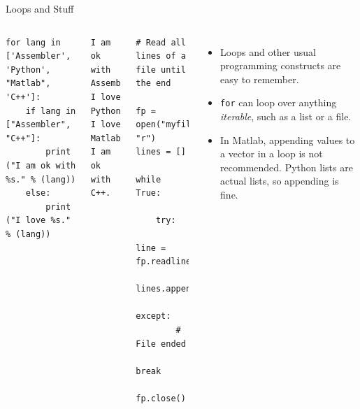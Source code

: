 \documentclass[10pt, aspectratio=169]{beamer} %
\begin{document}
\begin{frame}[fragile,allowframebreaks=0.8]
 {Loops and Stuff}
\begin{columns}[onlytextwidth]
\begin{lstlisting}
for lang in ['Assembler', 'Python', "Matlab", 'C++']:
    if lang in ["Assembler", "C++"]:
        print ("I am ok with %s." % (lang))
    else:
        print ("I love %s." % (lang))
\end{lstlisting}
\begin{lstlisting}
I am ok with Assembler.
I love Python.
I love Matlab.
I am ok with C++.
\end{lstlisting}
\begin{lstlisting}
# Read all lines of a file until the end

fp = open("myfile.txt", "r")
lines = []

while True:
    
    try:
        line = fp.readline()
        lines.append(line)
    except:
        # File ended
        break

fp.close()
\end{lstlisting}
\begin{itemize}
\item Loops and other usual programming constructs are easy to remember.
\item \verb+for+ can loop over anything \emph{iterable}, such as a list or a file.
\item In Matlab, appending values to a vector in a loop is not recommended.
Python lists are actual lists, so appending is fine.
\end{itemize}
\end{columns}
\end{frame}
\end{document}
